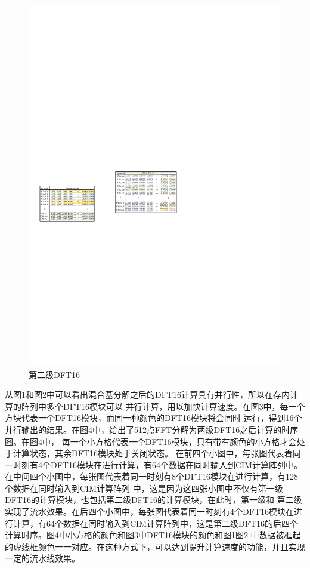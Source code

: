 \documentclass[12pt,a4paper]{article}
\begin{document}
\begin{figure}[htbp]
\centering
\includegraphics[scale=1.5]{figure/figure2}
\caption{第二级DFT16}
\end{figure}

从图1和图2中可以看出混合基分解之后的DFT16计算具有并行性，所以在存内计算的阵列中多个DFT16模块可以
并行计算，用以加快计算速度。在图3中，每一个方块代表一个DFT16模块，而同一种颜色的DFT16模块将会同时
运行，得到16个并行输出的结果。在图4中，给出了512点FFT分解为两级DFT16之后计算的时序图。在图4中，
每一个小方格代表一个DFT16模块，只有带有颜色的小方格才会处于计算状态，其余DFT16模块处于关闭状态。
在前四个小图中，每张图代表着同一时刻有4个DFT16模块在进行计算，有64个数据在同时输入到CIM计算阵列中。
在中间四个小图中，每张图代表着同一时刻有8个DFT16模块在进行计算，有128个数据在同时输入到CIM计算阵列
中，这是因为这四张小图中不仅有第一级DFT16的计算模块，也包括第二级DFT16的计算模块，在此时，第一级和
第二级实现了流水效果。在后四个小图中，每张图代表着同一时刻有4个DFT16模块在进行计算，有64个数据在同时输入到CIM计算阵列中，这是第二级DFT16的后四个计算时序。图4中小方格的颜色和图3中DFT16模块的颜色和图1图2
中数据被框起的虚线框颜色一一对应。在这种方式下，可以达到提升计算速度的功能，并且实现一定的流水线效果。
\end{document}
